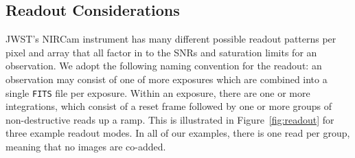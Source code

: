 \documentclass[iop]{emulateapj}
\begin{document}




\subsection{Readout Considerations}\label{sec:readout}
JWST's NIRCam instrument has many different possible readout patterns per pixel and array that all factor in to the SNRs and saturation limits for an observation.
We adopt the following naming convention for the readout: an observation may consist of one of more exposures which are combined into a single \texttt{FITS} file per exposure.
Within an exposure, there are one or more integrations, which consist of a reset frame followed by one or more groups of non-destructive reads up a ramp.
This is illustrated in Figure~\ref{fig:readout} for three example readout modes.
In all of our examples, there is one read per group, meaning that no images are co-added.
\end{document}
